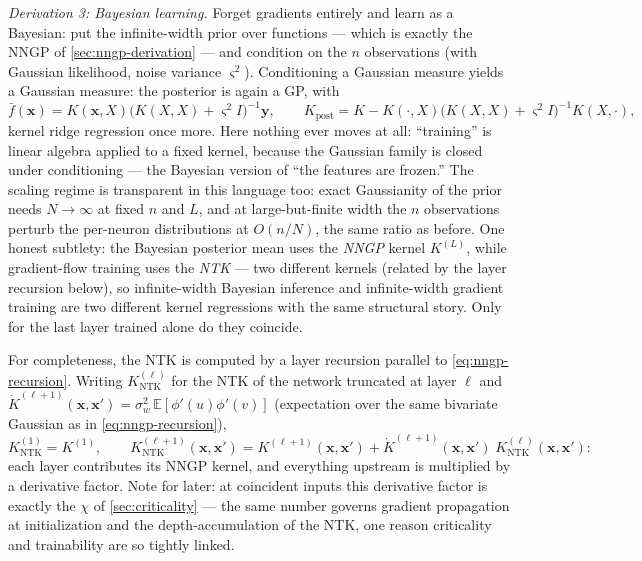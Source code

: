 \documentclass[11pt]{article}
\newcommand{\E}{\mathbb{E}}
\newcommand{\bv}[1]{\boldsymbol{#1}}
\newcommand{\ntk}{K_{\mathrm{NTK}}}
\begin{document}
\emph{Derivation 3: Bayesian learning.} Forget gradients entirely and
learn as a Bayesian: put the infinite-width prior over functions ---
which is exactly the NNGP of \cref{sec:nngp-derivation} --- and condition
on the $n$ observations (with Gaussian likelihood, noise variance
$\varsigma^2$). Conditioning a Gaussian measure yields a Gaussian
measure: the posterior is again a GP, with
\begin{equation}
  \label{eq:gp-posterior}
  \bar f(\bv{x}) = K(\bv{x},X)\bigl(K(X,X) + \varsigma^2 I\bigr)^{-1}
  \bv{y},
  \qquad
  K_{\mathrm{post}} = K - K(\cdot,X)\bigl(K(X,X) + \varsigma^2
  I\bigr)^{-1} K(X,\cdot),
\end{equation}
kernel ridge regression once more. Here nothing ever moves at all:
``training'' is linear algebra applied to a fixed kernel, because the
Gaussian family is closed under conditioning --- the Bayesian version of
``the features are frozen.'' The scaling regime is transparent in this
language too: exact Gaussianity of the prior needs $N \to \infty$ at
fixed $n$ and $L$, and at large-but-finite width the $n$ observations
perturb the per-neuron distributions at $O(n/N)$, the same ratio as
before. One honest subtlety: the Bayesian posterior mean uses the
\emph{NNGP} kernel $K^{(L)}$, while gradient-flow training uses the
\emph{NTK} --- two different kernels (related by the layer recursion
below), so infinite-width Bayesian inference and infinite-width gradient
training are two different kernel regressions with the same structural
story. Only for the last layer trained alone do they coincide.

For completeness, the NTK is computed by a layer recursion parallel to
\cref{eq:nngp-recursion}. Writing $\ntk^{(\ell)}$ for the NTK of the
network truncated at layer $\ell$ and
$\dot K^{(\ell+1)}(\bv{x},\bv{x}') = \sigma_w^2\,\E[\phi'(u)\phi'(v)]$
(expectation over the same bivariate Gaussian as in
\cref{eq:nngp-recursion}),
\begin{equation}
  \ntk^{(1)} = K^{(1)},
  \qquad
  \ntk^{(\ell+1)}(\bv{x},\bv{x}') = K^{(\ell+1)}(\bv{x},\bv{x}')
  + \dot K^{(\ell+1)}(\bv{x},\bv{x}')\;\ntk^{(\ell)}(\bv{x},\bv{x}') :
\end{equation}
each layer contributes its NNGP kernel, and everything upstream is
multiplied by a derivative factor. Note for later: at coincident inputs
this derivative factor is exactly the $\chi$ of
\cref{sec:criticality} --- the same number governs gradient propagation at
initialization and the depth-accumulation of the NTK, one reason
criticality and trainability are so tightly linked.
\end{document}
